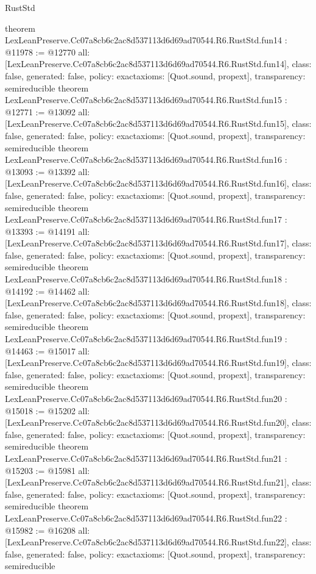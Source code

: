 \begin{lexlean}{RustStd}
\begin{coremodule}
{}
theorem LexLeanPreserve.Cc07a8cb6c2ac8d537113d6d69ad70544.R6.RustStd.fun14 : @11978 := @12770 {
  all: [LexLeanPreserve.Cc07a8cb6c2ac8d537113d6d69ad70544.R6.RustStd.fun14],
  class: false,
  generated: false,
  policy: exact{axioms: [Quot.sound, propext]},
  transparency: semireducible
}
theorem LexLeanPreserve.Cc07a8cb6c2ac8d537113d6d69ad70544.R6.RustStd.fun15 : @12771 := @13092 {
  all: [LexLeanPreserve.Cc07a8cb6c2ac8d537113d6d69ad70544.R6.RustStd.fun15],
  class: false,
  generated: false,
  policy: exact{axioms: [Quot.sound, propext]},
  transparency: semireducible
}
theorem LexLeanPreserve.Cc07a8cb6c2ac8d537113d6d69ad70544.R6.RustStd.fun16 : @13093 := @13392 {
  all: [LexLeanPreserve.Cc07a8cb6c2ac8d537113d6d69ad70544.R6.RustStd.fun16],
  class: false,
  generated: false,
  policy: exact{axioms: [Quot.sound, propext]},
  transparency: semireducible
}
theorem LexLeanPreserve.Cc07a8cb6c2ac8d537113d6d69ad70544.R6.RustStd.fun17 : @13393 := @14191 {
  all: [LexLeanPreserve.Cc07a8cb6c2ac8d537113d6d69ad70544.R6.RustStd.fun17],
  class: false,
  generated: false,
  policy: exact{axioms: [Quot.sound, propext]},
  transparency: semireducible
}
theorem LexLeanPreserve.Cc07a8cb6c2ac8d537113d6d69ad70544.R6.RustStd.fun18 : @14192 := @14462 {
  all: [LexLeanPreserve.Cc07a8cb6c2ac8d537113d6d69ad70544.R6.RustStd.fun18],
  class: false,
  generated: false,
  policy: exact{axioms: [Quot.sound, propext]},
  transparency: semireducible
}
theorem LexLeanPreserve.Cc07a8cb6c2ac8d537113d6d69ad70544.R6.RustStd.fun19 : @14463 := @15017 {
  all: [LexLeanPreserve.Cc07a8cb6c2ac8d537113d6d69ad70544.R6.RustStd.fun19],
  class: false,
  generated: false,
  policy: exact{axioms: [Quot.sound, propext]},
  transparency: semireducible
}
theorem LexLeanPreserve.Cc07a8cb6c2ac8d537113d6d69ad70544.R6.RustStd.fun20 : @15018 := @15202 {
  all: [LexLeanPreserve.Cc07a8cb6c2ac8d537113d6d69ad70544.R6.RustStd.fun20],
  class: false,
  generated: false,
  policy: exact{axioms: [Quot.sound, propext]},
  transparency: semireducible
}
theorem LexLeanPreserve.Cc07a8cb6c2ac8d537113d6d69ad70544.R6.RustStd.fun21 : @15203 := @15981 {
  all: [LexLeanPreserve.Cc07a8cb6c2ac8d537113d6d69ad70544.R6.RustStd.fun21],
  class: false,
  generated: false,
  policy: exact{axioms: [Quot.sound, propext]},
  transparency: semireducible
}
theorem LexLeanPreserve.Cc07a8cb6c2ac8d537113d6d69ad70544.R6.RustStd.fun22 : @15982 := @16208 {
  all: [LexLeanPreserve.Cc07a8cb6c2ac8d537113d6d69ad70544.R6.RustStd.fun22],
  class: false,
  generated: false,
  policy: exact{axioms: [Quot.sound, propext]},
  transparency: semireducible
}
\end{coremodule}
\end{lexlean}
